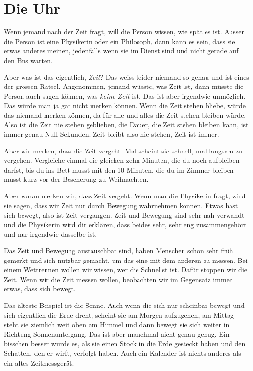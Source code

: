 \chapter*{Die Uhr}
\lettrine[lines=3]{W}{}enn jemand nach der Zeit fragt, will die Person wissen,
wie spät es ist. Ausser die Person ist eine Physikerin oder ein Philosoph, dann
kann es sein, dass sie etwas anderes meinen, jedenfalls wenn sie im Dienst sind
und nicht gerade auf den Bus warten.

Aber was ist das eigentlich, \textit{Zeit}? Das weiss leider niemand so genau
und ist eines der grossen Rätsel. Angenommen, jemand wüsste, was Zeit ist, dann
müsste die Person auch sagen können, was \textit{keine Zeit} ist. Das ist aber
irgendwie unmöglich. Das würde man ja gar nicht merken können. Wenn die Zeit
stehen bliebe, würde das niemand merken können, da für alle und alles die Zeit
stehen bleiben würde. Also ist die Zeit nie stehen geblieben, die Dauer, die
Zeit stehen bleiben kann, ist immer genau Null Sekunden. Zeit bleibt also nie
stehen, Zeit ist immer.

Aber wir merken, dass die Zeit vergeht. Mal scheint sie schnell, mal langsam zu
vergehen. Vergleiche einmal die gleichen zehn Minuten, die du noch aufbleiben
darfst, bis du ins Bett musst mit den 10 Minuten, die du im Zimmer bleiben
musst kurz vor der Bescherung zu Weihnachten.

Aber woran merken wir, dass Zeit vergeht. Wenn man die Physikerin fragt, wird
sie sagen, dass wir Zeit nur durch Bewegung wahrnehmen können. Etwas hast sich
bewegt, also ist Zeit vergangen. Zeit und Bewegung sind sehr nah verwandt und
die Physikerin wird dir erklären, dass beides sehr, sehr eng zusammengehört und
nur irgendwie dasselbe ist.

Das Zeit und Bewegung austauschbar sind, haben Menschen schon sehr früh gemerkt
und sich nutzbar gemacht, um das eine mit dem anderen zu messen. Bei einem
Wettrennen wollen wir wissen, wer die Schnellst ist. Dafür stoppen wir die
Zeit. Wenn wir die Zeit messen wollen, beobachten wir im Gegensatz immer etwas,
dass sich bewegt.

Das älteste Beispiel ist die Sonne. Auch wenn die sich nur scheinbar bewegt und
sich eigentlich die Erde dreht, scheint sie am Morgen aufzugehen, am Mittag
steht sie ziemlich weit oben am Himmel und dann bewegt sie sich weiter in
Richtung Sonnenuntergang. Das ist aber manchmal nicht genau genug. Ein bisschen
besser wurde es, als sie einen Stock in die Erde gesteckt haben und den
Schatten, den er wirft, verfolgt haben. Auch ein Kalender ist nichts anderes
als ein altes Zeitmessgerät.

